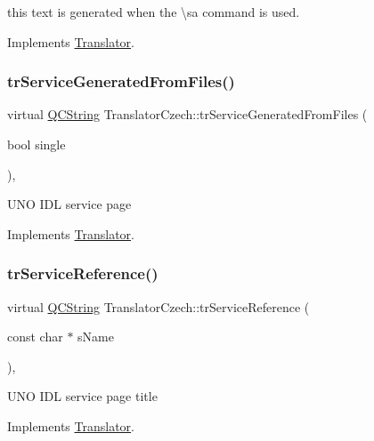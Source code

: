 this text is generated when the \textbackslash{}sa command is used. 

Implements \mbox{\hyperlink{class_translator}{Translator}}.

\mbox{\label{class_translator_czech_ae948f0820bce650419e4770080f5ee9b}} 
\subsubsection{\texorpdfstring{trServiceGeneratedFromFiles()}{trServiceGeneratedFromFiles()}}
{\footnotesize\ttfamily virtual \mbox{\hyperlink{class_q_c_string}{Q\+C\+String}} Translator\+Czech\+::tr\+Service\+Generated\+From\+Files (\begin{DoxyParamCaption}\item[{bool}]{single }\end{DoxyParamCaption})\hspace{0.3cm}{\ttfamily [inline]}, {\ttfamily [virtual]}}

U\+NO I\+DL service page 

Implements \mbox{\hyperlink{class_translator}{Translator}}.

\mbox{\label{class_translator_czech_a3506cc838ca852d88ce584d6005d5c5e}} 
\subsubsection{\texorpdfstring{trServiceReference()}{trServiceReference()}}
{\footnotesize\ttfamily virtual \mbox{\hyperlink{class_q_c_string}{Q\+C\+String}} Translator\+Czech\+::tr\+Service\+Reference (\begin{DoxyParamCaption}\item[{const char $\ast$}]{s\+Name }\end{DoxyParamCaption})\hspace{0.3cm}{\ttfamily [inline]}, {\ttfamily [virtual]}}

U\+NO I\+DL service page title 

Implements \mbox{\hyperlink{class_translator}{Translator}}.

